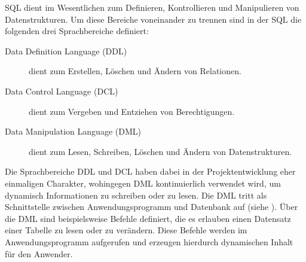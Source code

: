 SQL dient im Wesentlichen zum Definieren, Kontrollieren und Manipulieren von
Datenstrukturen. Um diese Bereiche voneinander zu trennen sind in der SQL die
folgenden drei Sprachbereiche definiert:

\begin{description}
  \item[Data Definition Language (DDL)] dient zum Erstellen, Löschen und Ändern
  von Relationen.
  \item[Data Control Language (DCL)] dient zum Vergeben und Entziehen von
  Berechtigungen.
  \item[Data Manipulation Language (DML)] dient zum Lesen, Schreiben, Löschen
  und Ändern von Datenstrukturen.
\end{description}

Die Sprachbereiche DDL und DCL haben dabei in der Projektentwicklung eher
einmaligen Charakter, wohingegen DML kontinuierlich verwendet wird, um
dynamisch Informationen zu schreiben oder zu lesen. Die DML tritt als
Schnittstelle zwischen Anwendungsprogramm und Datenbank auf (siehe
). Über die DML sind beispielsweise Befehle definiert,
die es erlauben einen Datensatz einer Tabelle zu lesen oder zu verändern. Diese
Befehle werden im Anwendungsprogramm aufgerufen und erzeugen hierdurch
dynamischen Inhalt für den Anwender.